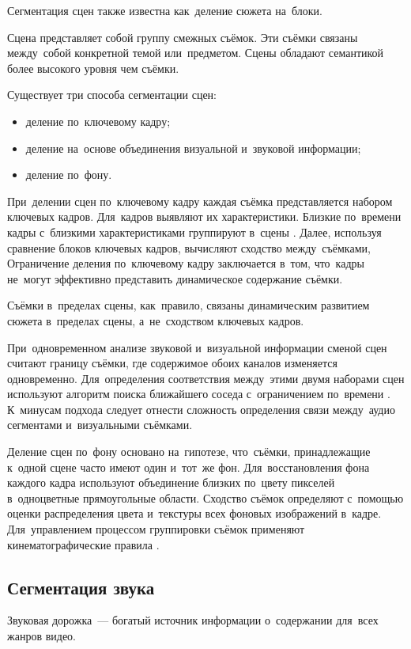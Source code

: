 Сегментация сцен также известна как~деление сюжета на~блоки.

Сцена представляет собой группу смежных съёмок.
Эти съёмки связаны между~собой конкретной темой или~предметом.
Сцены обладают семантикой более высокого уровня чем съёмки.

Существует три способа сегментации сцен:
\begin{itemize}
    \item деление по~ключевому кадру;
    \item деление на~основе объединения визуальной и~звуковой информации;
    \item деление по~фону.
\end{itemize}

При~делении сцен по~ключевому кадру каждая съёмка представляется набором
ключевых кадров. Для~кадров выявляют их характеристики.
Близкие по~времени кадры с~близкими
характеристиками группируют в~сцены \cite{Truong:2003}.
Далее, используя сравнение блоков ключевых кадров,
вычисляют сходство между~съёмками,
Ограничение деления по~ключевому кадру заключается в~том, что~кадры
не~могут эффективно представить динамическое содержание съёмки.

Съёмки в~пределах сцены, как~правило,
связаны динамическим развитием сюжета в~пределах сцены,
а~не~сходством ключевых кадров.


При~одновременном анализе звуковой и~визуальной информации сменой сцен считают
границу съёмки, где содержимое обоих каналов изменяется одновременно.
Для~определения соответствия между~этими двумя наборами сцен
используют алгоритм поиска ближайшего соседа
с~ограничением по~времени \cite{Sundaram:2000}.
К~минусам подхода следует отнести сложность
определения связи между~аудио сегментами и~визуальными съёмками.

Деление сцен по~фону основано на~гипотезе, что~съёмки,
принадлежащие к~одной сцене часто имеют один и~тот~же фон.
Для~восстановления фона каждого кадра используют объединение
близких по~цвету пикселей в~одноцветные прямоугольные области.
Сходство съёмок определяют с~помощью оценки распределения
цвета и~текстуры всех фоновых изображений в~кадре.
Для~управлением процессом группировки съёмок
применяют кинематографические правила \cite{Chen:2008}.

\subsection{Сегментация звука}

Звуковая дорожка~— богатый источник информации
о~содержании для~всех жанров видео.

